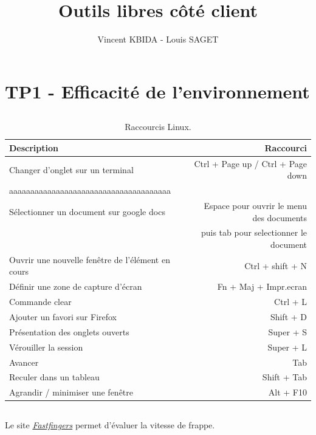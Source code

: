 \documentclass{article}
\title{Outils libres côté client}
\author{Vincent KBIDA - Louis SAGET}
\begin{document}
\maketitle

\section{TP1 - Efficacité de l'environnement}

\subsection{}

\begin{table}[h]
\centering
\begin{tabular}{l|r}

Description & Raccourci \\\hline
Changer d’onglet sur un terminal & Ctrl + Page up / Ctrl + Page down \\aaaaaaaaaaaaaaaaaaaaaaaaaaaaaaaaaaaaaa\\
\hline
Sélectionner un document sur google docs & Espace pour ouvrir le menu des documents \\
\hline
 & puis tab pour selectionner le document \\
 \hline
Ouvrir une nouvelle fenêtre de l’élément en cours & Ctrl + shift + N\\
\hline
Définir une zone de capture d’écran & Fn + Maj + Impr.ecran\\
\hline
Commande clear & Ctrl + L\\
\hline
Ajouter un favori sur Firefox & Shift + D\\
\hline
Présentation des onglets ouverts & Super + S\\
\hline
Vérouiller la session & Super + L\\
\hline
Avancer & Tab\\
\hline
Reculer dans un tableau & Shift + Tab\\
\hline
Agrandir / minimiser une fenêtre & Alt + F10


\end{tabular}
\caption{\label{tab:widgets}Raccourcis Linux.}
\end{table}

\subsection{}

Le site \href{https://10fastfingers.com/typing-test/french}{\emph{Fastfingers}} permet d’évaluer la vitesse de frappe.
\end{document}
